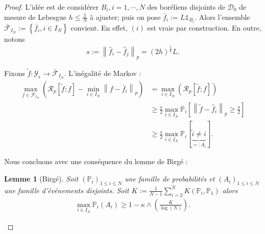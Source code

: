\documentclass[11pt,letterpaper]{article}
\newtheorem{lemme}{Lemme}
\begin{document}
\begin{proof}
\par L'idée est de considérer $B_i, i = 1, \cdots, N$ des boréliens disjoints de $\mathcal{D}_0$ de mesure de Lebesgue $h \leq \frac{1}{N}$ à ajuster; puis on pose $\bar{f}_i := L \mathds{1}_{B_i}$. Alors l'ensemble  $\bar{\mathcal{F}}_{I_N} := \left\lbrace \bar{f}_i, i \in I_N \right\rbrace$ convient. En effet, $(i)$ est vraie par construction. En outre, notons
\begin{equation}
	\begin{split}
		s := \left\| \hat{f}_i - \hat{f}_j \right\|_p = \left( 2 h \right)^{\frac{1}{p}} L .
	\end{split}
\end{equation}

\par Fixons $\tilde{f}: \mathcal{Y}_\epsilon \to \bar{\mathcal{F}}_{I_N} $. L'inégalité de Markov :
\begin{equation}
	\begin{split}
		\max\limits_{f \in \bar{\mathcal{F}}_{I_N}} \left( \mathcal{R}_p \left[ \tilde{f}; f \right] - \min\limits_{i \in I_N} \left\| f - \bar{f}_i \right\|_p \right) & = \max\limits_{i \in I_N} \left( \mathcal{R}_p \left[ \tilde{f}; f \right] \right) \\
		& \geq \frac{s}{2} \max\limits_{i \in I_N} \mathbb{P}_i \left[ \left\| \tilde{f} - \hat{f}_i \right\|_p \geq \frac{s}{2} \right] \\
		& \geq \frac{s}{2} \max\limits_{i \in I_N} \mathbb{P}_i \left[ \underbrace{ \tilde{i} \neq i }_{=: A_i} \right] .
	\end{split}
\end{equation}

\par Nous concluons avec une conséquence du lemme de Birgé :
\begin{lemme}[Birgé]
\par Soit $\left( \mathbb{P}_i \right)_{1 \leq i \leq N}$ une famille de probabilités et $\left( A_i \right)_{1 \leq i \leq N}$ une famille d'événements disjoints. Soit $K := \frac{1}{N - 1} \sum\limits_{i = 2}^{N} K \left( \mathbb{P}_i, \mathbb{P}_1 \right)$ alors
\begin{equation}
	\begin{split}
		\max\limits_{i \in I_N} \mathbb{P}_i \left( A_i \right) \geq 1 - \kappa \wedge \left( \frac{K}{\log \left( N \right)} \right) .
	\end{split}
\end{equation}


\end{lemme}
\end{proof}
\end{document}
